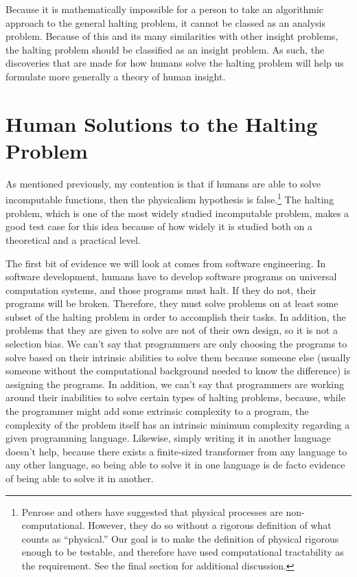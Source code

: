 Because it is mathematically impossible for a person to take an algorithmic approach to the general halting problem, it cannot be classed as an analysis problem.  Because of this and its many similarities with other insight problems, the halting problem should be classified as an insight problem.  As such, the discoveries that are made for how humans solve the halting problem will help us formulate more generally a theory of human insight.

\section{Human Solutions to the Halting Problem}

As mentioned previously, my contention is that if humans are able to solve incomputable functions, then the physicalism hypothesis is false.\footnote{Penrose and others have suggested that physical processes are non-computational.  However, they do so without a rigorous definition of what counts as ``physical.''  Our goal is to make the definition of physical rigorous enough to be testable, and therefore have used computational tractability as the requirement.  See the final section for additional discussion.}  The halting problem, which is one of the most widely studied incomputable problem, makes a good test case for this idea because of how widely it is studied both on a theoretical and a practical level.

The first bit of evidence we will look at comes from software engineering.  In software development, humans have to develop software programs on universal computation systems, and those programs must halt.  If they do not, their programs will be broken.  Therefore, they must solve problems on at least some subset of the halting problem in order to accomplish their tasks.  In addition, the problems that they are given to solve are not of their own design, so it is not a selection bias.  We can't say that programmers are only choosing the programs to solve based on their intrinsic abilities to solve them because someone else (usually someone without the computational background needed to know the difference) is assigning the programs.  In addition, we can't say that programmers are working around their inabilities to solve certain types of halting problems, because, while the programmer might add some extrinsic complexity to a program, the complexity of the problem itself has an intrinsic minimum complexity regarding a given programming language.  Likewise, simply writing it in another language doesn't help, because there exists a finite-sized transformer from any language to any other language, so being able to solve it in one language is de facto evidence of being able to solve it in another.

